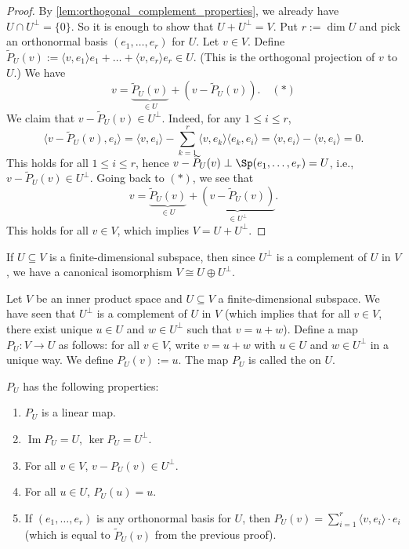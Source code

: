 \begin{proof}
By \cref{lem:orthogonal_complement_properties}, we already have $U \cap U^\perp = \{0\}$. So it is enough to show that $U + U^\perp = V$.
Put $r := \dim U$ and pick an orthonormal basis $(e_1, \dots, e_r)$ for $U$. Let $v \in V$.
Define $\widetilde{P}_U(v) := \langle v, e_1 \rangle e_1 + \dots + \langle v, e_r \rangle e_r \in U$. (This is the orthogonal projection of $v$ to $U$.)
We have
\[ v = \underbrace{\widetilde{P}_U(v)}_{\in U} + (v - \widetilde{P}_U(v)). \quad (*) \]
We claim that $v - \widetilde{P}_U(v) \in U^\perp$. Indeed, for any $1 \leq i \leq r$,
\[ \langle v - \widetilde{P}_U(v), e_i \rangle = \langle v, e_i \rangle - \sum_{k=1}^r \langle v, e_k \rangle \langle e_k, e_i \rangle = \langle v, e_i \rangle - \langle v, e_i \rangle = 0. \]
This holds for all $1 \leq i \leq r$, hence $v - \widetilde{P}_U(v) \perp \Sp(e_1, \dots, e_r) = U$, i.e., $v - \widetilde{P}_U(v) \in U^\perp$.
Going back to $(*)$, we see that
\[ v = \underbrace{\widetilde{P}_U(v)}_{\in U} + \underbrace{(v - \widetilde{P}_U(v))}_{\in U^\perp}. \]
This holds for all $v \in V$, which implies $V = U + U^\perp$.
\end{proof}

\begin{remark}
If $U \subseteq V$ is a finite-di\-men\-sional subspace, then since $U^\perp$ is a complement of $U$ in $V$, we have a canonical isomorphism $V \cong U \oplus U^\perp$.
\end{remark}

\begin{definition}
\label{def:orthogonal_projection}
Let $V$ be an inner product space and $U \subseteq V$ a finite-di\-men\-sional subspace. We have seen that $U^\perp$ is a complement of $U$ in $V$ (which implies that for all $v \in V$, there exist unique $u \in U$ and $w \in U^\perp$ such that $v = u + w$).
Define a map $P_U \colon V \to U$ as follows: for all $v \in V$, write $v = u + w$ with $u \in U$ and $w \in U^\perp$ in a unique way. We define $P_U(v) := u$. The map $P_U$ is called the  on $U$.
\end{definition}

\begin{proposition}
\label{prop:orthogonal_projection_properties}
$P_U$ has the following properties:
\begin{enumerate}
    \item $P_U$ is a linear map.
    \item $\operatorname{Im} P_U = U$, $\ker P_U = U^\perp$.
    \item For all $v \in V$, $v - P_U(v) \in U^\perp$.
    \item For all $u \in U$, $P_U(u) = u$.
    \item If $(e_1, \dots, e_r)$ is any orthonormal basis for $U$, then $P_U(v) = \sum_{i=1}^r \langle v, e_i \rangle \cdot e_i$ (which is equal to $\widetilde{P}_U(v)$ from the previous proof).
\end{enumerate}
\end{proposition}

